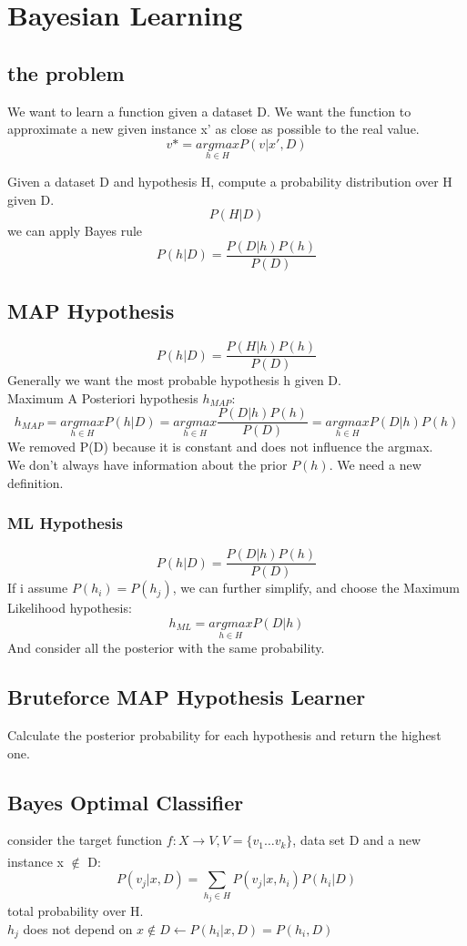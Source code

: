 \section{Bayesian Learning}

\subsection{the problem}
We want to learn a function given a dataset D. We want the function to approximate a new given instance x' as close as possible to the real value.
\[v* = \underset{h \in H}{argmax} P(v|x', D)\]

Given a dataset D and hypothesis H, compute a probability distribution over H given D.
\[P(H|D)\]
we can apply Bayes rule
\[P(h|D) = \frac{P(D|h)P(h)}{P(D)}\]

\subsection{MAP Hypothesis}
\[P(h|D) = \frac {P(H|h)P(h)}{P(D)}\]
Generally we want the most probable hypothesis h given D.\\
Maximum A Posteriori hypothesis $h_{MAP}$:
\[h_{MAP} = \underset{h \in H}{argmax}P(h|D) = \underset{h \in H}{argmax} \frac{P(D|h)P(h)}{P(D)} = \underset{h \in H}{argmax} P(D|h)P(h)\]
We removed P(D) because it is constant and does not influence the argmax. \\
We don't always have information about the prior $P(h)$. We need a new definition.
\subsubsection{ML Hypothesis}
\[P(h|D) = \frac{P(D|h)P(h)}{P(D)}\]
If i assume $P(h_{i}) = P(h_{j})$, we can further simplify, and choose the Maximum Likelihood hypothesis:
\[h_{ML} = \underset{h \in H}{argmax} P(D|h)\]
And consider all the posterior with the same probability.

\subsection{Bruteforce MAP Hypothesis Learner}
Calculate the posterior probability for each hypothesis  and return the highest one.
\subsection{Bayes Optimal Classifier}
consider the target function $f:X \xrightarrow[]{}V, V = \{v_{1}\dots v_{k}\}$, data set D and a new instance x $ \not\in $ D:
\[P(v_{j}|x, D) = \sum_{h_{j} \in H} P(v_{j}|x, h_{i})P(h_{i}|D)\]
total probability over H. \\
$h_{j}$ does not depend  on $x \not\in D \xleftarrow[]{}P(h_{i}|x,D) = P(h_{i},D)$

